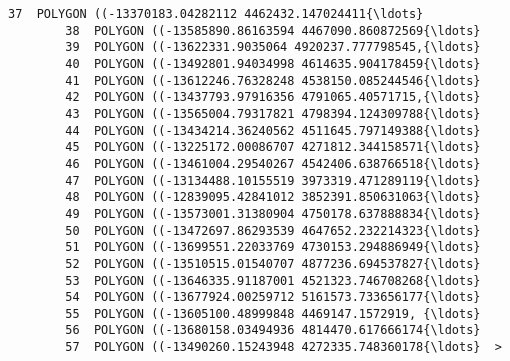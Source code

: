 \documentclass[11pt]{article}
\begin{document}
\begin{Verbatim}[commandchars=\\\{\}]
        37  POLYGON ((-13370183.04282112 4462432.147024411{\ldots}  
        38  POLYGON ((-13585890.86163594 4467090.860872569{\ldots}  
        39  POLYGON ((-13622331.9035064 4920237.777798545,{\ldots}  
        40  POLYGON ((-13492801.94034998 4614635.904178459{\ldots}  
        41  POLYGON ((-13612246.76328248 4538150.085244546{\ldots}  
        42  POLYGON ((-13437793.97916356 4791065.40571715,{\ldots}  
        43  POLYGON ((-13565004.79317821 4798394.124309788{\ldots}  
        44  POLYGON ((-13434214.36240562 4511645.797149388{\ldots}  
        45  POLYGON ((-13225172.00086707 4271812.344158571{\ldots}  
        46  POLYGON ((-13461004.29540267 4542406.638766518{\ldots}  
        47  POLYGON ((-13134488.10155519 3973319.471289119{\ldots}  
        48  POLYGON ((-12839095.42841012 3852391.850631063{\ldots}  
        49  POLYGON ((-13573001.31380904 4750178.637888834{\ldots}  
        50  POLYGON ((-13472697.86293539 4647652.232214323{\ldots}  
        51  POLYGON ((-13699551.22033769 4730153.294886949{\ldots}  
        52  POLYGON ((-13510515.01540707 4877236.694537827{\ldots}  
        53  POLYGON ((-13646335.91187001 4521323.746708268{\ldots}  
        54  POLYGON ((-13677924.00259712 5161573.733656177{\ldots}  
        55  POLYGON ((-13605100.48999848 4469147.1572919, {\ldots}  
        56  POLYGON ((-13680158.03494936 4814470.617666174{\ldots}  
        57  POLYGON ((-13490260.15243948 4272335.748360178{\ldots}  >
\end{Verbatim}
            
\end{document}
